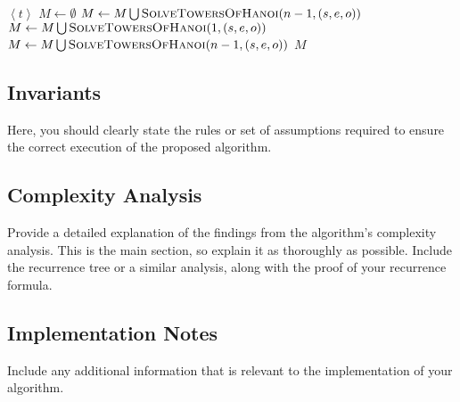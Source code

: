 \documentclass[letterpaper,12pt]{article}
\theoremstyle{definition}
\begin{document}
\begin{algorithm}[H]
    \begin{algorithmic}[1]

                \State \Return $\left\langle t \right\rangle$
            \Else
                \State $M \leftarrow \emptyset$
                \State $M \leftarrow M \bigcup \text{\Call{SolveTowersOfHanoi}{\ensuremath{n - 1, \left(s, e, o\right)}}}$
                \State $M \leftarrow M \bigcup \text{\Call{SolveTowersOfHanoi}{\ensuremath{1, \left(s, e, o\right)}}}$
                \State $M \leftarrow M \bigcup \text{\Call{SolveTowersOfHanoi}{\ensuremath{n - 1, \left(s, e, o\right)}}}$
                \State \Return $M$
            \EndIf
            \EndProcedure
    \end{algorithmic}
\end{algorithm}

\subsection{Invariants}
Here, you should clearly state the rules or set of assumptions required to ensure the correct execution of the proposed algorithm.

\subsection{Complexity Analysis}
Provide a detailed explanation of the findings from the algorithm's complexity analysis. This is the main section, so explain it as thoroughly as possible. Include the recurrence tree or a similar analysis, along with the proof of your recurrence formula.

\subsection{Implementation Notes}
Include any additional information that is relevant to the implementation of your algorithm.
\end{document}

